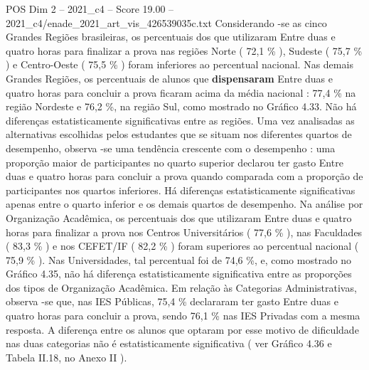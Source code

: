 \begin{textsample}{POS Dim 2 – 2021\_c4 – Score 19.00 – 2021\_c4/enade\_2021\_art\_vis\_426539035c.txt}
Considerando -se as cinco Grandes Regiões brasileiras, os percentuais dos que utilizaram Entre duas e quatro horas para finalizar a prova nas regiões Norte ( 72,1 \% ), Sudeste ( 75,7 \% ) e Centro-Oeste ( 75,5 \% ) foram inferiores ao percentual nacional.
Nas demais Grandes Regiões, os percentuais de alunos que \textbf{dispensaram} Entre duas e quatro horas para concluir a prova ficaram acima da média nacional : 77,4 \% na região Nordeste e 76,2 \%, na região Sul, como mostrado no Gráfico 4.33.
Não há diferenças estatisticamente significativas entre as regiões.
Uma vez analisadas as alternativas escolhidas pelos estudantes que se situam nos diferentes quartos de desempenho, observa -se uma tendência crescente com o desempenho : uma proporção maior de participantes no quarto superior declarou ter gasto Entre duas e quatro horas para concluir a prova quando comparada com a proporção de participantes nos quartos inferiores.
Há diferenças estatisticamente significativas apenas entre o quarto inferior e os demais quartos de desempenho.
Na análise por Organização Acadêmica, os percentuais dos que utilizaram Entre duas e quatro horas para finalizar a prova nos Centros Universitários ( 77,6 \% ), nas Faculdades ( 83,3 \% ) e nos CEFET/IF ( 82,2 \% ) foram superiores ao percentual nacional ( 75,9 \% ).
Nas Universidades, tal percentual foi de 74,6 \%, e, como mostrado no Gráfico 4.35, não há diferença estatisticamente significativa entre as proporções dos tipos de Organização Acadêmica.
Em relação às Categorias Administrativas, observa -se que, nas IES Públicas, 75,4 \% declararam ter gasto Entre duas e quatro horas para concluir a prova, sendo 76,1 \% nas IES Privadas com a mesma resposta.
A diferença entre os alunos que optaram por esse motivo de dificuldade nas duas categorias não é estatisticamente significativa ( ver Gráfico 4.36 e Tabela II.18, no Anexo II ).

\end{textsample}
